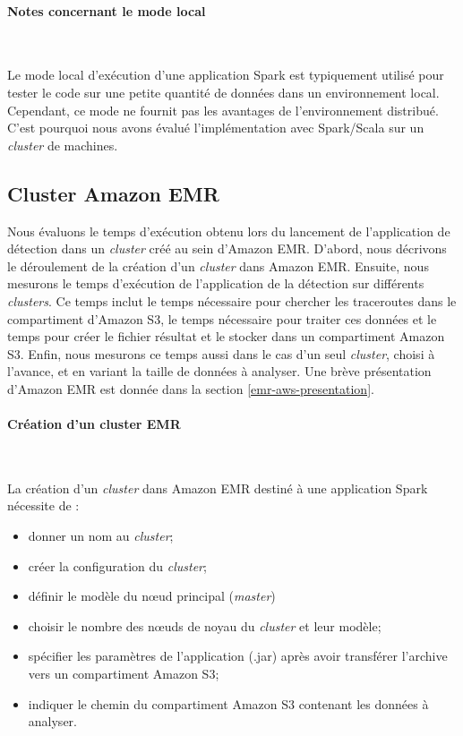 \paragraph{Notes concernant le mode local}~

Le mode local d'exécution d'une application Spark est typiquement utilisé pour tester le code sur une petite quantité de données dans un environnement local. Cependant, ce mode  ne fournit pas les avantages de l'environnement distribué. C'est pourquoi nous avons évalué l'implémentation avec Spark/Scala sur un \textit{cluster} de machines. 

\subsection{Cluster Amazon EMR}

Nous évaluons le temps d'exécution obtenu lors du lancement de l'application de détection dans un \textit{cluster} créé au sein d'Amazon EMR. D'abord, nous  décrivons le déroulement de la création d'un \textit{cluster} dans Amazon EMR. Ensuite, nous mesurons le temps d'exécution de l'application de la détection sur différents \textit{clusters}. Ce temps inclut le temps nécessaire  pour chercher les traceroutes dans le compartiment d'Amazon S3, le temps nécessaire pour traiter ces données et  le temps pour créer le fichier résultat et le stocker dans un compartiment Amazon S3. Enfin, nous mesurons ce temps  aussi dans le cas d'un seul \textit{cluster}, choisi à l'avance, et en variant la taille  de données à analyser. Une brève présentation d'Amazon EMR est donnée dans la section \ref{emr-aws-presentation}.

\paragraph{Création d'un cluster EMR}~

La création d'un \textit{cluster} dans Amazon EMR destiné à une application Spark nécessite de  :
\begin{itemize}
	\item donner un nom au \textit{cluster};
	\item créer la configuration du \textit{cluster};
	\item définir le modèle du n\oe{}ud principal (\textit{master}) 
	\item choisir le nombre des n\oe{}uds de noyau  du \textit{cluster} et leur modèle;
	\item spécifier les paramètres de l'application  (.jar) après avoir transférer l'archive vers  un compartiment Amazon S3;
	\item indiquer le chemin du compartiment Amazon S3 contenant  les données à analyser.
\end{itemize}

